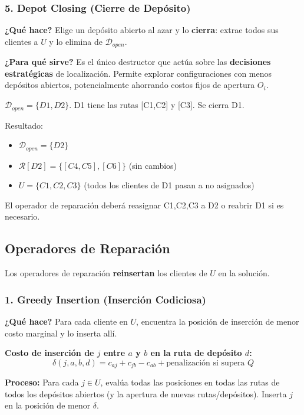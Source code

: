\documentclass[12pt,a4paper]{article}
\begin{document}
\subsubsection{5. Depot Closing (Cierre de Depósito)}

\textbf{¿Qué hace?} Elige un depósito abierto al azar y lo \textbf{cierra}: extrae todos sus clientes a $U$ y lo elimina de $\mathcal{D}_{open}$.

\textbf{¿Para qué sirve?} Es el único destructor que actúa sobre las \textbf{decisiones estratégicas} de localización. Permite explorar configuraciones con menos depósitos abiertos, potencialmente ahorrando costos fijos de apertura $O_i$.

\begin{ejemplo}
$\mathcal{D}_{open} = \{D1, D2\}$. D1 tiene las rutas [C1,C2] y [C3]. Se cierra D1.

Resultado:
\begin{itemize}
\item $\mathcal{D}_{open} = \{D2\}$
\item $\mathcal{R}[D2] = \{[C4,C5], [C6]\}$ (sin cambios)
\item $U = \{C1, C2, C3\}$ (todos los clientes de D1 pasan a no asignados)
\end{itemize}

El operador de reparación deberá reasignar C1,C2,C3 a D2 o reabrir D1 si es necesario.
\end{ejemplo}

\subsection{Operadores de Reparación}

Los operadores de reparación \textbf{reinsertan} los clientes de $U$ en la solución.

\subsubsection{1. Greedy Insertion (Inserción Codiciosa)}

\textbf{¿Qué hace?} Para cada cliente en $U$, encuentra la posición de inserción de menor costo marginal y lo inserta allí.

\textbf{Costo de inserción de $j$ entre $a$ y $b$ en la ruta de depósito $d$:}
$$\delta(j, a, b, d) = c_{aj} + c_{jb} - c_{ab} + \text{penalización si supera }Q$$

\textbf{Proceso:} Para cada $j \in U$, evalúa todas las posiciones en todas las rutas de todos los depósitos abiertos (y la apertura de nuevas rutas/depósitos). Inserta $j$ en la posición de menor $\delta$.
\end{document}
